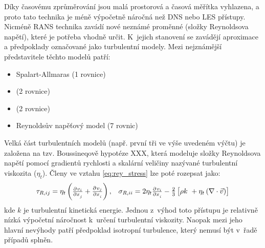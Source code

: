 Díky časovému zprůměrování jsou malá prostorová a časová měřítka vyhlazena, a proto tato technika je méně výpočetně náročná než DNS nebo LES přístupy. Nicméně RANS technika zavádí nové neznámé proměnné (složky Reynoldsova napětí), které je potřeba vhodně určit. K~jejich stanovení se zavádějí aproximace a předpoklady označované jako turbulentní modely. Mezi nejznámější představitele těchto modelů patří: 
\begin{itemize}[itemsep=0pt,parsep=0pt,partopsep=0pt,topsep=0pt]
  \item Spalart-Allmaras (1 rovnice) 
  \item \keps{} (2 rovnice) 
  \item \komg{} (2 rovnice) 
  \item Reynoldsův napěťový model (7 rovnic)
\end{itemize}
Velká část turbulentních modelů (např. první tři ve výše uvedeném výčtu) je založena na tzv. Boussineqově hypotéze XXX, která modeluje složky Reynoldsova napětí pomocí gradientů rychlosti a skalární veličiny nazývané turbulentní viskozita ($\eta_{t}$). Členy ve vztahu \ref{eq:rey_stress} lze poté rozepsat jako: 
\begin{equation}
    \begin{array}{cc}
      \tau_{R,ij} = \eta_{t}\left( \pd{v_{i}}{x_{j}} + \pd{v_{j}}{x_{i}} \right), & \sigma_{R,ii} = 2\eta_{t}\pd{v_{i}}{x_{i}}  - \frac{2}{3} \left[ \rho k~+ \eta_{t} \left( \nabla  \cdot \vec{v} \right) \right]
      \end{array}
      \label{eq:rey_stress_bus}
\end{equation}
kde $k$ je turbulentní kinetická energie. Jednou z~výhod toto přístupu je relativně nízká výpočetní náročnost k~určení turbulentní viskozity. Naopak mezi jeho hlavní nevýhody patří předpoklad isotropní turbulence, který nemusí být v~řadě případů splněn.  

